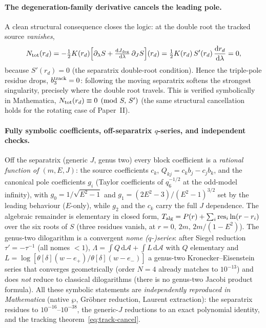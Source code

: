 \documentclass[12pt]{iopart}
\newcommand{\Jc}{J_{\rm deg}}
\newcommand{\dd}{\mathrm{d}}
\begin{document}
\paragraph{The degeneration-family derivative cancels the leading pole.}
A clean structural consequence closes the logic: at the double root the tracked
source \emph{vanishes},
\begin{equation}
N_{\rm tot}(r_d)=-\tfrac12K(r_d)\Big[\partial_\lambda S
+\tfrac{\dd\Jc}{\dd\lambda}\,\partial_JS\Big](r_d)
=\tfrac12K(r_d)\,S'(r_d)\,\frac{\dd r_d}{\dd\lambda}=0,
\label{eq:track-cancel}
\end{equation}
because $S'(r_d)=0$ (the separatrix double-root condition). Hence the triple-pole
residue drops, $b_3^{\rm track}=0$: following the moving separatrix softens the
strongest singularity, precisely where the double root travels. This is verified
symbolically in Mathematica, $N_{\rm tot}(r_d)\equiv0\pmod{S,\,S'}$ (the same structural
cancellation holds for the rotating case of Paper~II).

\paragraph{Fully symbolic coefficients, off-separatrix $q$-series, and independent checks.}
Off the separatrix (generic $J$, genus two) every block coefficient is a
\emph{rational function of $(m,E,J)$}: the source coefficients $c_k$,
$Q_{kj}=c_kb_j-c_jb_k$, and the canonical pole coefficients $g_i$ (Taylor
coefficients of $q_6^{-1/2}$ at the odd-model infinity), with
$g_0=1/\sqrt{E^2-1}$ and $g_1=(2E^2-3)/(E^2-1)^{3/2}$ set by the leading behaviour
($E$-only), while $g_2$ and the $c_k$ carry the full $J$ dependence. The
algebraic remainder is elementary in closed form,
$T_{\rm alg}=P(r)+\sum_i\mathrm{res}_i\ln(r-r_i)$ over the six roots of $S$
(three residues vanish, at $r=0,\,2m,\,2m/(1-E^2)$). The genus-two dilogarithm is a
convergent \emph{nome ($q$-)series}: after Siegel reduction $\tau'=-\tau^{-1}$ (all
nomes ${<}1$), $\Lambda=\int Q\,\dd\mathcal A+\int L\,\dd\mathcal A$ with $Q$
elementary and $L=\log[\theta[\delta](w-e_+)/\theta[\delta](w-e_-)]$ a genus-two
Kronecker--Eisenstein series that converges geometrically (order $N{=}4$ already
matches to $10^{-13}$) and does \emph{not} reduce to classical dilogarithms (there is
no genus-two Jacobi product formula). All these symbolic statements are
\emph{independently reproduced in Mathematica} (native $\wp$, Gröbner reduction,
Laurent extraction): the separatrix residues to $10^{-16}$--$10^{-38}$, the generic-$J$
reductions to an exact polynomial identity, and the tracking
theorem~\eqref{eq:track-cancel}.
\end{document}
